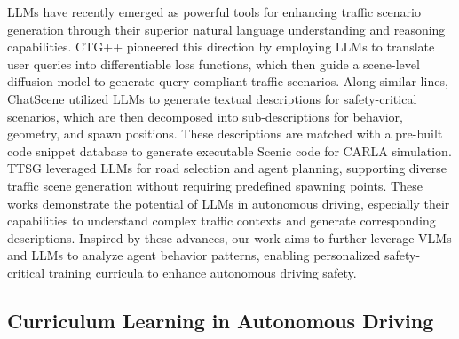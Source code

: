 LLMs have recently emerged as powerful tools for enhancing traffic scenario generation through their superior natural language understanding and reasoning capabilities. CTG++ \citep{zhong2023language} pioneered this direction by employing LLMs to translate user queries into differentiable loss functions, which then guide a scene-level diffusion model to generate query-compliant traffic scenarios. Along similar lines, ChatScene \citep{zhang2024chatscene} utilized LLMs to generate textual descriptions for safety-critical scenarios, which are then decomposed into sub-descriptions for behavior, geometry, and spawn positions. These descriptions are matched with a pre-built code snippet database to generate executable Scenic code for CARLA simulation. TTSG \citep{ruan2024traffic} leveraged LLMs for road selection and agent planning, supporting diverse traffic scene generation without requiring predefined spawning points. These works demonstrate the potential of LLMs in autonomous driving, especially their capabilities to understand complex traffic contexts and generate corresponding descriptions. Inspired by these advances, our work aims to further leverage VLMs and LLMs to analyze agent behavior patterns, enabling personalized safety-critical training curricula to enhance autonomous driving safety.


\subsection{Curriculum Learning in Autonomous Driving}

